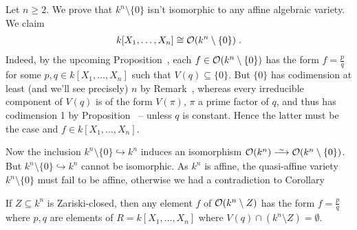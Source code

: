 \documentclass[a4paper,parskip=half,numbers=enddot, DIV=12]{scrreprt}
\renewcommand{\geq}{\geqslant}
\begin{document}
	\begin{rem}
		Let $n\geq2$. We prove that $k^n\setminus\{0\}$ isn't isomorphic to any affine algebraic variety. We claim 
		\begin{align*}
			k[X_1,\ldots, X_n] \cong\mathcal{O}(k^n\setminus\{0\})\;.
		\end{align*}
		Indeed, by the upcoming Proposition~, each $f\in \mathcal{O}(k^n\setminus\{0\})$ has the form $f=\frac pq$ for some $p,q\in k[X_1,\ldots,X_n]$ such that $V(q)\subseteq \{0\}$. But $\{0\}$ has codimension at least (and we'll see precisely) $n$ by Remark~, whereas every irreducible component of $V(q)$ is of the form $V(\pi)$, $\pi$ a prime factor of $q$, and thus has codimension 1 by Proposition~ -- unless $q$ is constant. Hence the latter must be the case and $f\in k[X_1,\ldots,X_n]$.
		
		Now the inclusion $k^n\setminus \{0\} \hookrightarrow k^n$ induces an isomorphism $\Oo(k^n) \isomorphism \Oo(k^n\setminus\{0\})$. But $k^n\setminus\{0\}\hookrightarrow k^n$ cannot be isomorphic. As $k^n$ is affine, the quasi-affine variety $k^n\setminus \{0\}$  must fail to be affine, otherwise we had a contradiction to Corollary~
	\end{rem}
	\begin{prop}
	 	If $Z\subseteq k^n$ is Zariski-closed, then any element $f$ of $\mathcal{O}(k^n\setminus Z)$ has the form $f=\frac{p}{q}$ where $p,q$ are elements of $R= k[X_1,\ldots, X_n]$ where $V(q)\cap (k^n\setminus Z) = \emptyset$.
	\end{prop}
\end{document}
